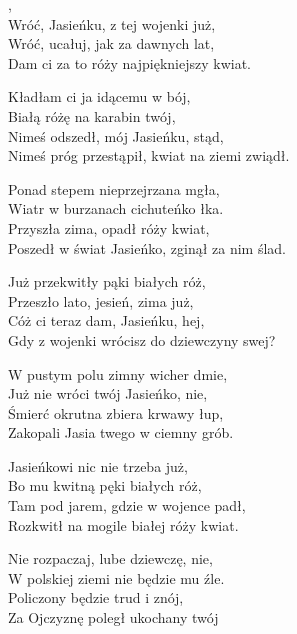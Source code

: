 \documentclass[12pt,a4paper,twoside]{songbook}
\begin{document}
\begin{lyrics}[longestline={Nimeś próg przestąpił, kwiat na ziemi zwiądł.}]
,\\
Wróć, Jasieńku, z tej wojenki już,\\
Wróć, ucałuj, jak za dawnych lat,\\
Dam ci za to róży najpiękniejszy kwiat.

Kładłam ci ja idącemu w bój,\\
Białą różę na karabin twój,\\
Nimeś odszedł, mój Jasieńku, stąd,\\
Nimeś próg przestąpił, kwiat na ziemi zwiądł.

Ponad stepem nieprzejrzana mgła,\\
Wiatr w burzanach cichuteńko łka.\\
Przyszła zima, opadł róży kwiat,\\
Poszedł w świat Jasieńko, zginął za nim ślad.

Już przekwitły pąki białych róż,\\
Przeszło lato, jesień, zima już,\\
Cóż ci teraz dam, Jasieńku, hej,\\
Gdy z wojenki wrócisz do dziewczyny swej?

W pustym polu zimny wicher dmie,\\
Już nie wróci twój Jasieńko, nie,\\
Śmierć okrutna zbiera krwawy łup,\\
Zakopali Jasia twego w ciemny grób.

Jasieńkowi nic nie trzeba już,\\
Bo mu kwitną pęki białych róż,\\
Tam pod jarem, gdzie w wojence padł,\\
Rozkwitł na mogile białej róży kwiat.

Nie rozpaczaj, lube dziewczę, nie,\\
W polskiej ziemi nie będzie mu źle.\\
Policzony będzie trud i znój,\\
Za Ojczyznę poległ ukochany twój
\end{lyrics}
\end{document}
